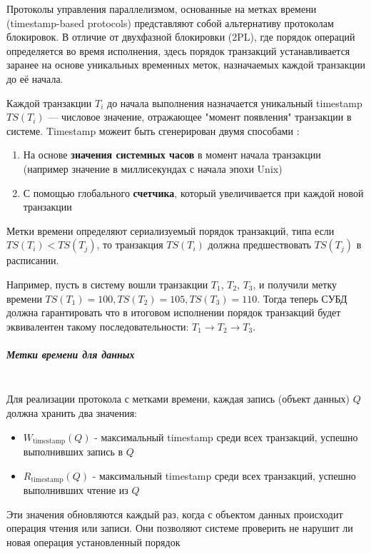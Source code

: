 Протоколы управления параллелизмом, основанные на метках времени (timestamp-based protocols) представляют собой альтернативу протоколам блокировок. В отличие от двухфазной блокировки (2PL), где порядок операций определяется во время исполнения, здесь порядок транзакций устанавливается заранее на основе уникальных временных меток, назначаемых каждой транзакции до её начала.

Каждой транзакции $T_i$ до начала выполнения назначается уникальный timestamp $TS(T_i)$ — числовое значение, отражающее "момент появления" транзакции в системе. Timestamp можеит быть сгенерирован двумя способами \autocite[ch.18 §5]{Silberschatz}:
\begin{enumerate}
    \item На основе \textbf{значения системных часов} в момент начала транзакции (например значение в миллисекундах с начала эпохи Unix)
    \item С помощью глобального \textbf{счетчика}, который увеличивается при каждой новой транзакции 
\end{enumerate}

Метки времени определяют сериализуемый порядок транзакций, типа если $TS(T_i) < TS(T_j)$, то транзакция $TS(T_i)$ должна предшествовать $TS(T_j)$ в расписании.

Например, пусть в систему вошли транзакции $T_1$, $T_2$, $T_3$, и получили метку времени $TS(T_1) = 100, TS(T_2) = 105, TS(T_3) = 110$. Тогда теперь СУБД должна гарантировать что в итоговом исполнении порядок транзакций будет эквивалентен такому последовательности: $T_1 \rightarrow T_2 \rightarrow T_3$.

\subparagraph{Метки времени для данных} ~\\
Для реализации протокола с метками времени, каждая запись (объект данных) $Q$ должна хранить два значения:

\begin{itemize}
    \item $W_{\text{timestamp}}(Q)$ - максимальный timestamp среди всех транзакций, успешно выполнивших запись в $Q$
    \item $R_{\text{timestamp}}(Q)$ - максимальный timestamp среди всех транзакций, успешно выполнивших чтение из $Q$
\end{itemize}


Эти значения обновляются каждый раз, когда с объектом данных происходит операция чтения или записи. Они позволяют системе проверить не нарушит ли новая операция установленный порядок

